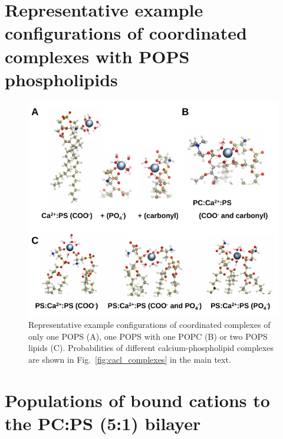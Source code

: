 \documentclass[journal=jctcce,manuscript=article]{achemso}
\newlength{\figwidth}
\newlength{\figwidthfull}
\begin{document}
\pagebreak




\section{Representative example configurations of  coordinated complexes with POPS phospholipids}

\begin{figure}[!h] 
  \centering 
  \includegraphics[width=\figwidthfull]{../img/populations_stoichiometry_structures_SI.pdf}
  \caption{\label{fig:strcutures_SI} 
    Representative example configurations of  coordinated complexes 
    of only one POPS (A), one POPS with one POPC (B) or two POPS lipids (C). 
    Probabilities of different calcium-phospholipid complexes are shown in Fig.~\ref{fig:cacl_complexes} in the main text. 
  }
\end{figure} 


\pagebreak
\section{Populations of bound  cations to the PC:PS (5:1) bilayer}
\end{document}
